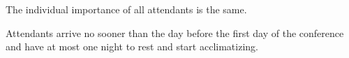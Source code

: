 \begin{assumption}
The individual importance of all attendants is the same.
\end{assumption}

\begin{assumption}
Attendants arrive no sooner than the day before the first day of the conference and have at most one night to rest and start acclimatizing.
\end{assumption}




